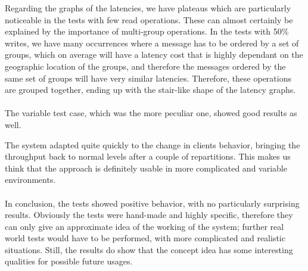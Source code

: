 Regarding the graphs of the latencies, we have plateaus which are particularly noticeable in the tests with few read operations. These can almost certainly be explained by the importance of multi-group operations. In the tests with 50\% writes, we have many occurrences where a message has to be ordered by a set of groups, which on average will have a latency cost that is highly dependant on the geographic location of the groups, and therefore the messages ordered by the same set of groups will have very similar latencies. Therefore, these operations are grouped together, ending up with the stair-like shape of the latency graphs. 
\\\\
The variable test case, which was the more peculiar one, showed good results as well.

The system adapted quite quickly to the change in clients behavior, bringing the throughput back to normal levels after a couple of repartitions. This makes us think that the approach is definitely usable in more complicated and variable environments.
\\\\
In conclusion, the tests showed positive behavior, with no particularly surprising results. Obviously the tests were hand-made and highly specific, therefore they can only give an approximate idea of the working of the system; further real world tests would have to be performed, with more complicated and realistic situations. Still, the results do show that the concept idea has some interesting qualities for possible future usages.


